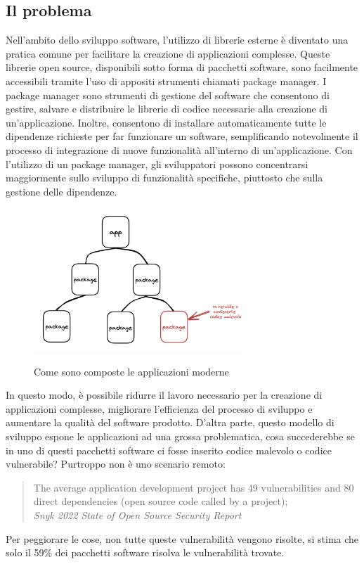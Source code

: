 \subsection{Il problema}
\label{sec:security-problem}
Nell'ambito dello sviluppo software, l'utilizzo di librerie esterne è diventato una pratica comune per facilitare la
creazione di applicazioni complesse. Queste librerie open source, disponibili sotto forma di pacchetti software, sono
facilmente accessibili tramite l'uso di appositi strumenti chiamati package manager. I package manager sono strumenti di
gestione del software che consentono di gestire, salvare e distribuire le librerie di codice necessarie alla creazione
di un'applicazione. Inoltre, consentono di installare automaticamente tutte le dipendenze richieste per far funzionare
un software, semplificando notevolmente il processo di integrazione di nuove funzionalità all'interno di
un'applicazione. Con l'utilizzo di un package manager, gli sviluppatori possono concentrarsi maggiormente sullo sviluppo
di funzionalità specifiche, piuttosto che sulla gestione delle dipendenze.
\begin{figure}[h]
    \centering
    \captionsetup{justification=centering}
    \includegraphics[width=8cm]{./chapters/2.wasi-in-depth/images/1.malicious_or_vuln_code.png}
    \label{app_package}
    \caption{Come sono composte le applicazioni moderne}
\end{figure}
In questo modo, è possibile ridurre il lavoro necessario per la creazione di applicazioni complesse, migliorare
l'efficienza del processo di sviluppo e aumentare la qualità del software prodotto. D'altra parte, questo modello di
sviluppo espone le applicazioni ad una grossa problematica, cosa succederebbe se in uno di questi pacchetti software ci
fosse inserito codice malevolo o codice vulnerabile? Purtroppo non è uno scenario remoto:
\begin{quote}
    The average application development project has 49 vulnerabilities and 80 direct dependencies (open source code
    called by a project); \\
    \textit{Snyk 2022 State of Open Source Security
    Report}\cite{snyk-2022-open-source-security}
\end{quote}
Per peggiorare le cose, non tutte queste vulnerabilità vengono risolte, si stima che solo il 59\% dei pacchetti software
risolva le vulnerabilità trovate.

